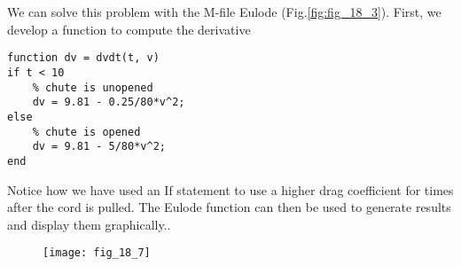 \documentclass[../main.tex]{subfiles}
\begin{document}
\section{}
\begin{blockquote}
We can solve this problem with the M-file Eulode (Fig.\ref{fig:fig_18_3}). First, we develop a function to compute the derivative
\end{blockquote}
	\bigbreak
\begin{lstlisting}[numbers=none]
function dv = dvdt(t, v)
if t < 10
	% chute is unopened
	dv = 9.81 - 0.25/80*v^2;
else
	% chute is opened
	dv = 9.81 - 5/80*v^2;
end 

\end{lstlisting}
	\bigbreak
\begin{blockquote}
Notice how we have used an If statement to use a higher drag coefficient for times after the cord is pulled. The Eulode function can then be used to generate results and display them graphically..
\end{blockquote}
	\bigbreak
	\begin{figure}[H]
		\texttt{[image: fig\_18\_7]}
		\label{fig:fig_18_7}
	\end{figure}
	\bigbreak
\end{document}
